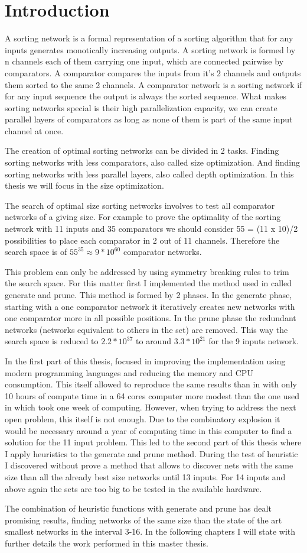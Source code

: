 \documentclass[../main.tex]{subfiles}
\begin{document}
\section{Introduction}
A sorting network is a formal representation of a sorting algorithm that for any inputs generates
monotically increasing outputs. A sorting network is formed by n channels each of them carrying one input,
which are connected pairwise by comparators. A comparator compares the inputs from it's 2 channels and 
outputs them sorted to the same 2 channels. A comparator network is a sorting network if for any 
input sequence the output is always the sorted sequence. What makes sorting networks special is their
high parallelization capacity, we can create parallel layers of comparators as long as none of them is part of
the same input channel at once.

The creation of optimal sorting networks can be divided in 2 tasks. Finding sorting networks with less comparators,
also called size optimization. And finding sorting networks with less parallel layers, also called depth optimization.
In this thesis we will focus in the size optimization.

The search of optimal size sorting networks involves to test all comparator networks of a giving size. 
For example to prove the optimality of the sorting network
with 11 inputs and 35 comparators we should consider 55 = (11 x 10)/2 possibilities to place each comparator in 2 out of 11 channels. Therefore the search space is of $55^{35} \approx 9 * 10^{60}$ comparator networks. 

This problem can only be addressed by using symmetry breaking rules to trim the search space. For this matter first I implemented the method used in \cite{sortingnineinputs} called generate and prune. This method is formed by 2 phases.
In the generate phase, starting with a one comparator network it iteratively creates new networks with one comparator more in all possible positions. In the prune phase the redundant networks (networks equivalent to others in the set) are removed. This way the search space is reduced to $2.2 * 10^{37}$ to around $3.3 * 10^{21}$ for the 9 inputs network.

In the first part of this thesis, focused in improving the implementation using modern programming languages and reducing the memory and CPU consumption. This itself allowed to reproduce the same results than in \cite{sortingnineinputs} with only 10 hours of compute time in a 64 cores computer more modest than the one used in \cite{sortingnineinputs} which took one week of computing. However, when trying to address the next open problem, this itself is not enough. Due to the combinatory explosion it would be necessary around a year of computing time in this computer to find a solution for the 11 input problem. This led to the second part of this thesis where I apply heuristics to the generate and prune method. During the test of heuristic I discovered without prove a method that allows to discover nets with the same size than all the already best size networks until 13 inputs. For 14 inputs and above again the sets are too big to be tested in the available hardware.

The combination of heuristic functions with generate and prune has dealt promising results, finding networks of the same size than the state of the art smallest networks in the interval 3-16. In the following chapters I will state with further details the work performed in this master thesis.
\end{document}
